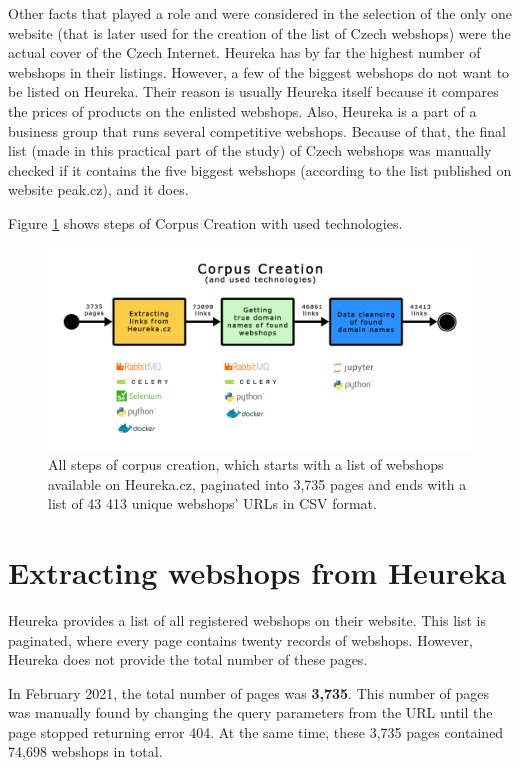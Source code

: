 Other facts that played a role and were considered in the selection of the only one website (that is later used for the creation of the list of Czech webshops) were the actual cover of the Czech Internet. Heureka has by far the highest number of webshops in their listings\cite{srovnavace-shoptet}. However, a few of the biggest webshops do not want to be listed on Heureka. Their reason is usually Heureka itself because it compares the prices of products on the enlisted webshops. Also, Heureka is a part of a business group that runs several competitive webshops. Because of that, the final list (made in this practical part of the study) of Czech webshops was manually checked if it contains the five biggest webshops (according to the list published on website peak.cz\cite{peak-eshopy}), and it does.

Figure \ref{fig:corpus_creation} shows steps of Corpus Creation with used technologies.

\begin{figure}[ht]
    \centering
    \includegraphics[width=1\linewidth]{media/corpus_creation.png}
    \caption{All steps of corpus creation, which starts with a list of webshops available on Heureka.cz, paginated into 3,735 pages and ends with a list of 43 413 unique webshops' URLs in CSV format.}
    \label{fig:corpus_creation}
\end{figure}

\section{Extracting webshops from Heureka}

Heureka provides a list of all registered webshops on their website. This list is paginated, where every page contains twenty records of webshops. However, Heureka does not provide the total number of these pages. 

In February 2021, the total number of pages was \textbf{3,735}. This number of pages was manually found by changing the query parameters from the URL until the page stopped returning error 404. At the same time, these 3,735 pages contained 74,698 webshops in total. 

